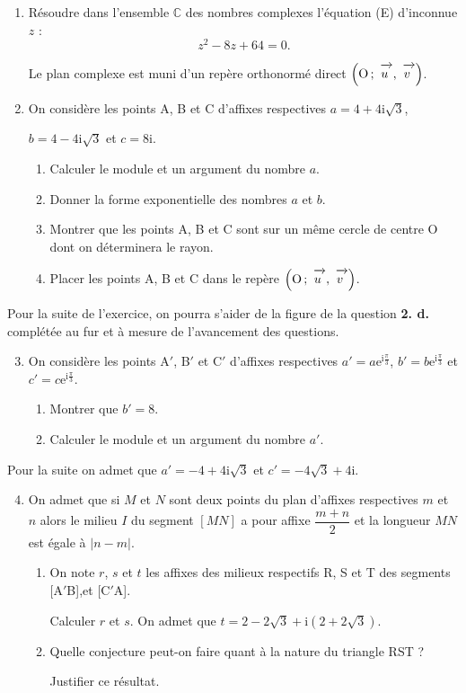 \documentclass[10pt]{article}
\newcommand{\C}{\mathbb{C}}
\newcommand{\vect}[1]{\mathchoice%
{\overrightarrow{\displaystyle\mathstrut#1\,\,}}%
{\overrightarrow{\textstyle\mathstrut#1\,\,}}%
{\overrightarrow{\scriptstyle\mathstrut#1\,\,}}%
{\overrightarrow{\scriptscriptstyle\mathstrut#1\,\,}}}
\def\Ouv{$\left(\text{O}\,;~\vect{u},~\vect{v}\right)$}
\begin{document}
\begin{enumerate}
\item Résoudre dans l'ensemble $\C$ des nombres complexes l'équation (E) d'inconnue $z$ :
\[z^2 - 8z + 64 = 0.\]

Le plan complexe est muni d'un repère orthonormé direct \Ouv.
\item On considère les points A, B et C d'affixes respectives $a = 4 + 4\text{i}\sqrt{3}$,

$b = 4 - 4\text{i}\sqrt{3}$ et $c = 8\text{i}$.
	\begin{enumerate}
		\item Calculer le module et un argument du nombre $a$.
		\item Donner la forme exponentielle des nombres $a$ et $b$.
		\item Montrer que les points A, B et C sont sur un même cercle de centre O dont on déterminera le rayon.
		\item Placer les points A, B et C dans le repère \Ouv.
	\end{enumerate}
	\end{enumerate}

		
Pour la suite de l'exercice, on pourra s'aider de la figure de la question \textbf{2. d.} complétée au fur et à mesure de l'avancement des questions.

\begin{enumerate}
\setcounter{enumi}{2}

\item On considère les points A$'$, B$'$ et C$'$ d'affixes respectives $a' = a \text{e}^{\text{i}\frac{\pi}{3}}$, $b' = b\text{e}^{\text{i}\frac{\pi}{3}}$ et $c' = c\text{e}^{\text{i}\frac{\pi}{3}}$.
	\begin{enumerate}
		\item Montrer que $b' = 8$.
		\item Calculer le module et un argument du nombre $a'$.
	\end{enumerate}
\end{enumerate}
				
Pour la suite on admet que $a' = -4 + 4\text{i}\sqrt{3}$ et $c' = - 4\sqrt{3} + 4\text{i}$.

\begin{enumerate}
\setcounter{enumi}{3}

\item On admet que si $M$ et $N$ sont deux points du plan d'affixes respectives $m$ et $n$ alors le milieu $I$ du segment $[MN]$ a pour affixe $\dfrac{m + n}{2}$ et la longueur $MN$ est égale à $|n - m|$.
	\begin{enumerate}
		\item On note $r$, $s$ et $t$ les affixes des milieux respectifs R, S et T des segments [A$'$B],\: [B$'$C] et [C$'$A].
		
Calculer $r$ et $s$. On admet que $t = 2 - 2\sqrt{3} + \text{i}\left(2 + 2\sqrt{3}\right)$.
		\item Quelle conjecture peut-on faire quant à la nature du triangle RST ? 
		
Justifier ce résultat.
	\end{enumerate}
\end{enumerate}
\end{document}
